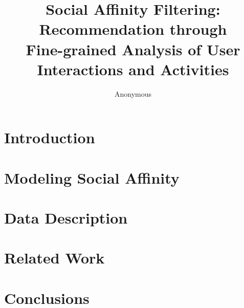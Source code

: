 \documentclass[letterpaper]{article}
\begin{document}
\title{Social Affinity Filtering: Recommendation through \\Fine-grained Analysis of User Interactions and Activities}
\author{Anonymous}

\maketitle

\begin{abstract}

\end{abstract}

\section{Introduction}



\section{Modeling Social Affinity}



\section{Data Description}




%







\section{Related Work}



\section{Conclusions}

%



\end{document}
